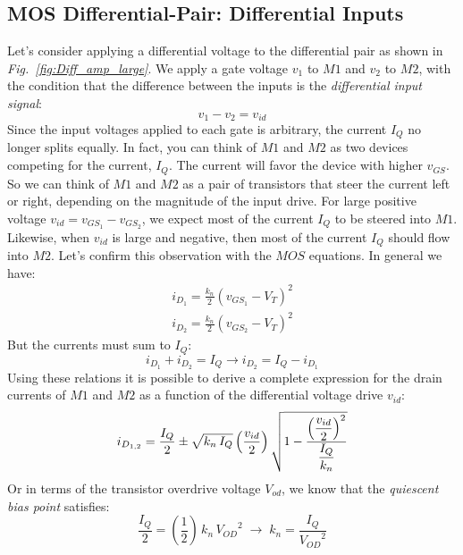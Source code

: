\subsection{MOS Differential-Pair:  Differential Inputs}
Let's consider applying a differential voltage to the differential pair as shown in \emph{Fig.~\ref{fig:Diff_amp_large}}.  We apply a gate voltage $v_1$ to $M1$ and $v_2$ to $M2$, with the condition that the difference between the inputs is the \textit{differential input signal}:
    \begin{equation}
        v_1 - v_2 = v_{id}
    \end{equation}
Since the input voltages applied to each gate is arbitrary, the current $I_Q$ no longer splits equally.  In fact, you can think of $M1$ and $M2$ as two devices competing for the current, $I_Q$.  The current will favor the device with higher $v_{GS}$.  So we can think of $M1$ and $M2$ as a pair of transistors that steer the current left or right, depending on the magnitude of the input drive.  For large positive voltage $v_{id} = v_{GS_1} - v_{GS_2}$, we expect most of the current $I_Q$ to be steered into $M1$.  Likewise, when $v_{id}$ is large and negative, then most of the current $I_Q$ should flow into $M2$.  Let's confirm this observation with the $MOS$ equations.  In general we have:
    \begin{align}
        i_{D_1} = \frac{k_n}{2}{\left(v_{GS_1} - V_T\right)^2}\\[0.15cm]
        i_{D_2} = \frac{k_n}{2}{\left(v_{GS_2} - V_T\right)^2}
    \end{align}
But the currents must sum to $I_Q$:
    \begin{equation}
        i_{D_1} + i_{D_2} = I_Q \rightarrow i_{D_2} = I_Q - i_{D_1}
    \end{equation}
Using these relations it is possible to derive a complete expression for the drain currents of $M1$ and $M2$ as a function of the differential voltage drive $v_{id}$:
    \begin{equation}
        i_{D_{1,2}} = \frac{I_Q}{2} \pm \sqrt{k_n\,I_Q} \left(\frac{v_{id}}{2}\right)
                        \sqrt{1 - \frac{{\mathlarger{\left(\frac{v_{id}}{2}\right)}}^2}{\mathlarger{\frac{I_Q}{k_n}}}}
    \end{equation}
Or in terms of the transistor overdrive voltage $V_{od}$, we know that the \textit{quiescent bias point} satisfies:
    \begin{equation}
        \frac{I_Q}{2} = \left(\frac{1}{2}\right)\,k_n\,{V_{OD}}^2 \;\longrightarrow\; k_n = \frac{I_Q}{{V_{OD}}^2}
    \end{equation}
